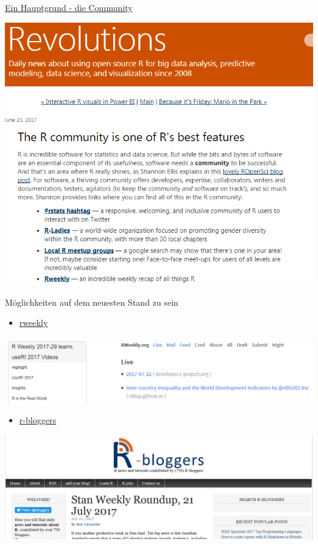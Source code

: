 \documentclass[ignorenonframetext,]{beamer}
\providecommand{\tightlist}{%
\setlength{\itemsep}{0pt}\setlength{\parskip}{0pt}}
\begin{document}
\begin{frame}{\href{http://blog.revolutionanalytics.com/2017/06/r-community.html}{Ein
Hauptgrund - die Community}}

\includegraphics{./tex2pdf.956/415849dd5b649c98c5239b741c3eeed83870e473.png}

\end{frame}

\begin{frame}{Möglichkeiten auf dem neuesten Stand zu sein}

\begin{itemize}
\tightlist
\item
  \href{https://rweekly.org/}{rweekly}
\end{itemize}

\includegraphics{./tex2pdf.956/d55db1fd3fe6749394b00af902ed3e5b81e8f49e.png}

\begin{itemize}
\tightlist
\item
  \href{https://www.r-bloggers.com/}{r-bloggers}
\end{itemize}

\includegraphics{./tex2pdf.956/76b89ea071e6ca673619294a009d8946ed81de59.png}

\end{frame}
\end{document}
